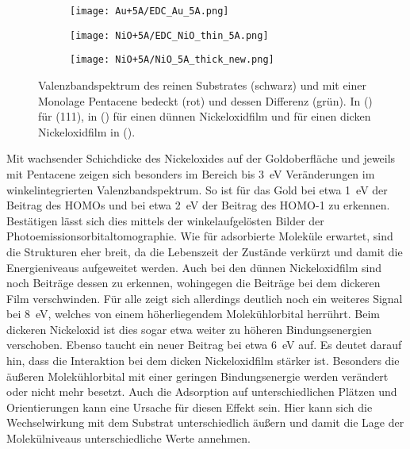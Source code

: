         \begin{figure}
            \centering
            \begin{subfigure}[t]{0.30\textwidth}
                \centering
                \texttt{[image: Au+5A/EDC\_Au\_5A.png]}
                \subcaption{}
                \label{fig:EDC_Au+5A}
            \end{subfigure}
            \begin{subfigure}[t]{0.30\textwidth}
                \centering
                \texttt{[image: NiO+5A/EDC\_NiO\_thin\_5A.png]}
                \subcaption{}
                \label{fig:EDC_NiO_thin+5A}
            \end{subfigure}
            \begin{subfigure}[t]{0.30\textwidth}
                \centering
                \texttt{[image: NiO+5A/NiO\_5A\_thick\_new.png]}
                \subcaption{}
                \label{fig:EDC_NiO+5A}
            \end{subfigure}
            \caption{Valenzbandspektrum des reinen Substrates (schwarz) und mit einer Monolage Pentacene bedeckt (rot) und dessen Differenz (grün).
            In () für (111), in () für einen dünnen Nickeloxidfilm und für einen dicken Nickeloxidfilm in ().}
        \end{figure}
        Mit wachsender Schichdicke des Nickeloxides auf der Goldoberfläche und jeweils mit Pentacene zeigen sich besonders im Bereich bis \SI{3}{\electronvolt} Veränderungen im winkelintegrierten Valenzbandspektrum.
        So ist für das Gold bei etwa \SI{1}{\electronvolt} der Beitrag des HOMOs und bei etwa \SI{2}{\electronvolt} der Beitrag des HOMO-1 zu erkennen.
        Bestätigen lässt sich dies mittels der winkelaufgelösten Bilder der Photoemissionsorbitaltomographie.
        Wie für adsorbierte Moleküle erwartet, sind die Strukturen eher breit, da die Lebenszeit der Zustände verkürzt und damit die Energieniveaus aufgeweitet werden.
        Auch bei den dünnen Nickeloxidfilm sind noch Beiträge dessen zu erkennen, wohingegen die Beiträge bei dem dickeren Film verschwinden.
        Für alle zeigt sich allerdings deutlich noch ein weiteres Signal bei \SI{8}{\electronvolt}, welches von einem höherliegendem Molekühlorbital herrührt.
        Beim dickeren Nickeloxid ist dies sogar etwa weiter zu höheren Bindungsenergien verschoben.
        Ebenso taucht ein neuer Beitrag bei etwa \SI{6}{\electronvolt} auf.
        Es deutet darauf hin, dass die Interaktion bei dem dicken Nickeloxidfilm stärker ist.
        Besonders die äußeren Molekühlorbital mit einer geringen Bindungsenergie werden verändert oder nicht mehr besetzt.
        Auch die Adsorption auf unterschiedlichen Plätzen und Orientierungen kann eine Ursache für diesen Effekt sein.
        Hier kann sich die Wechselwirkung mit dem Substrat unterschiedlich äußern und damit die Lage der Molekülniveaus unterschiedliche Werte annehmen.

